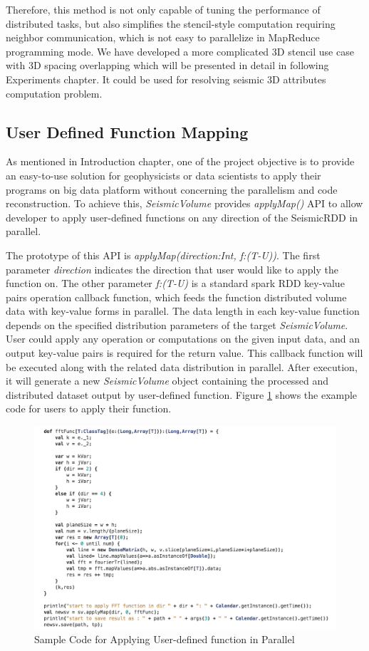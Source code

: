 Therefore, this method is not only capable of tuning the performance of distributed tasks, but also simplifies the stencil-style computation requiring neighbor communication, which is not easy to parallelize in MapReduce programming mode. We have developed a more complicated 3D stencil use case with 3D spacing overlapping which will be presented in detail in following Experiments chapter. It could be used for resolving seismic 3D attributes computation problem.


\subsection{User Defined Function Mapping}

As mentioned in Introduction chapter, one of the project objective is to provide an easy-to-use solution for geophysicists or data scientists to apply their programs on big data platform without concerning the parallelism and code reconstruction. To achieve this, \emph{SeismicVolume} provides \emph{applyMap()} API to allow developer to apply user-defined functions on any direction of the SeismicRDD in parallel. 

The prototype of this API is \emph{applyMap(direction:Int, f:(T-U))}. The first parameter \emph{direction} indicates the direction that user would like to apply the function on. The other parameter \emph{f:(T-U)} is a standard spark RDD key-value pairs operation callback function, which feeds the function distributed volume data with key-value forms in parallel. The data length in each key-value function depends on the specified distribution parameters of the target \emph{SeismicVolume}.  User could apply any operation or computations on the given input data, and an output key-value pairs is required for the return value. This callback function will be executed along with the related data distribution in parallel. After execution, it will generate a new \emph{SeismicVolume} object containing the processed and distributed dataset output by user-defined function.  Figure \ref{code_apply} shows the example code for users to apply their function.

\begin{figure}[h]
\centering
\includegraphics[scale=0.6]{figures/code_apply.png}
\caption{Sample Code for Applying User-defined function in Parallel}
\label{code_apply}
\end{figure}


